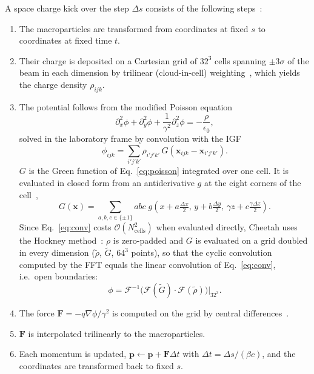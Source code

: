 \label{sec:method-placement}
A space charge kick over the step $\Delta s$ consists of the following
steps~\cite{dhamrait2026memory}:
\begin{enumerate}
  \item The macroparticles are transformed from coordinates at fixed $s$
  to coordinates at fixed time $t$.
  \item Their charge is deposited on a Cartesian grid of $32^3$ cells
  spanning $\pm3\sigma$ of the beam in each dimension by trilinear
  (cloud-in-cell) weighting~\cite{birdsall2004plasma}, which yields the
  charge density $\rho_{ijk}$.
  \item The potential follows from the modified Poisson
  equation~\cite{vay2008simulation}
  \begin{equation}
    \partial_x^2\phi + \partial_y^2\phi + \frac{1}{\gamma^2}\partial_z^2\phi
    = -\frac{\rho}{\epsilon_0},
    \label{eq:poisson}
  \end{equation}
  solved in the laboratory frame by convolution with the
  IGF~\cite{qiang2006three,dhamrait2026memory}
  \begin{equation}
    \phi_{ijk} = \sum_{i'j'k'} \rho_{i'j'k'}\,
    G(\mathbf{x}_{ijk}-\mathbf{x}_{i'j'k'}).
    \label{eq:conv}
  \end{equation}
  $G$ is the Green function of Eq.~\eqref{eq:poisson} integrated over one
  cell. It is evaluated in closed form from an antiderivative $g$ at the
  eight corners of the cell~\cite{qiang2024implementation},
  \begin{equation}
    G(\mathbf{x}) = \sum_{a,b,c\in\{\pm1\}} abc\;
    g\!\left(x+a\tfrac{\Delta x}{2},\, y+b\tfrac{\Delta y}{2},\,
    \gamma z+c\tfrac{\gamma\Delta z}{2}\right).
    \label{eq:igf}
  \end{equation}
  Since Eq.~\eqref{eq:conv} costs $\mathcal{O}(N_\mathrm{cells}^2)$ when
  evaluated directly, Cheetah uses the Hockney
  method~\cite{hockney1988computer}: $\rho$ is zero-padded and $G$ is
  evaluated on a grid doubled in every dimension ($\tilde\rho$, $\tilde G$,
  $64^3$ points), so that the cyclic convolution computed by the FFT equals
  the linear convolution of Eq.~\eqref{eq:conv}, i.e.\ open boundaries:
  \begin{equation}
    \phi = \mathcal{F}^{-1}\!\big(\mathcal{F}(\tilde G)\cdot
    \mathcal{F}(\tilde\rho)\big)\Big|_{32^3}.
    \label{eq:hockney}
  \end{equation}
  \item The force $\mathbf{F} = -q\nabla\phi/\gamma^2$ is computed on the
  grid by central differences~\cite{dhamrait2026memory}.
  \item $\mathbf{F}$ is interpolated trilinearly to the macroparticles.
  \item Each momentum is updated, $\mathbf{p}\leftarrow\mathbf{p}+
  \mathbf{F}\Delta t$ with $\Delta t = \Delta s/(\beta c)$, and the
  coordinates are transformed back to fixed $s$.
\end{enumerate}
